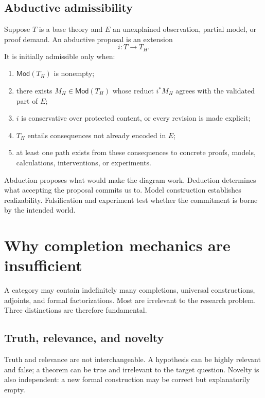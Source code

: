 \documentclass[11pt]{article}
\newcommand{\Mod}{\mathsf{Mod}}
\begin{document}
\subsection{Abductive admissibility}

Suppose $T$ is a base theory and $E$ an unexplained observation, partial model, or proof demand. An
abductive proposal is an extension
\begin{equation}
i:T\longrightarrow T_H.
\end{equation}
It is initially admissible only when:
\begin{enumerate}
  \item $\Mod(T_H)$ is nonempty;
  \item there exists $M_H\in\Mod(T_H)$ whose reduct $i^*M_H$ agrees with the validated part of $E$;
  \item $i$ is conservative over protected content, or every revision is made explicit;
  \item $T_H$ entails consequences not already encoded in $E$;
  \item at least one path exists from these consequences to concrete proofs, models, calculations,
  interventions, or experiments.
\end{enumerate}

Abduction proposes what would make the diagram work. Deduction determines what accepting the
proposal commits us to. Model construction establishes realizability. Falsification and experiment
test whether the commitment is borne by the intended world.

\section{Why completion mechanics are insufficient}

A category may contain indefinitely many completions, universal constructions, adjoints, and formal
factorizations. Most are irrelevant to the research problem. Three distinctions are therefore
fundamental.

\subsection{Truth, relevance, and novelty}

Truth and relevance are not interchangeable. A hypothesis can be highly relevant and false; a
theorem can be true and irrelevant to the target question. Novelty is also independent: a new formal
construction may be correct but explanatorily empty.
\end{document}
